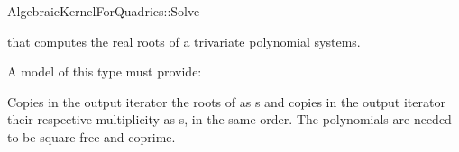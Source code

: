
\begin{ccRefFunctionObjectConcept}{AlgebraicKernelForQuadrics::Solve}

\ccDefinition

 that computes the real roots of a trivariate
polynomial systems.
 

A model of this type must provide:

{Copies in the output iterator  the roots of  as 
s 
and copies in the output iterator  
their respective multiplicity as s, in the same order.
The polynomials are needed to be square-free and coprime.}

\end{ccRefFunctionObjectConcept}

